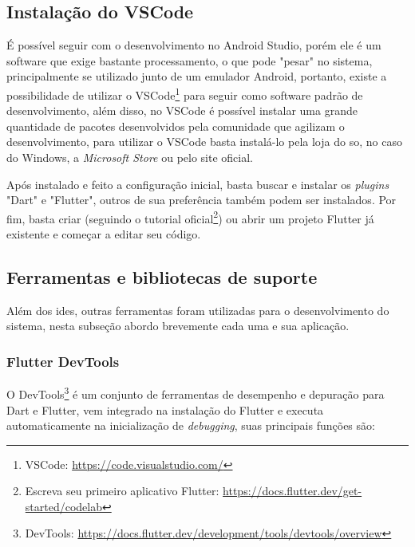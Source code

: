 \subsection{Instalação do VSCode}\label{ssec:instalacao_vscode}
É possível seguir com o desenvolvimento no Android Studio, porém ele é um software que exige bastante processamento, o que pode "pesar" no sistema, principalmente se utilizado junto de um emulador Android, portanto, existe a possibilidade de utilizar o VSCode\footnote{\label{vscode}VSCode: \url{https://code.visualstudio.com/}} para seguir como software padrão de desenvolvimento, além disso, no VSCode é possível instalar uma grande quantidade de pacotes desenvolvidos pela comunidade que agilizam o desenvolvimento, para utilizar o VSCode basta instalá-lo pela loja do \ac{so}, no caso do Windows, a \textit{Microsoft Store} ou pelo site oficial. 

Após instalado e feito a configuração inicial, basta buscar e instalar os \textit{plugins} "Dart" e "Flutter", outros de sua preferência também podem ser instalados. Por fim, basta criar (seguindo o tutorial oficial\footnote{\label{create_app}Escreva seu primeiro aplicativo Flutter: \url{https://docs.flutter.dev/get-started/codelab}}) ou abrir um projeto Flutter já existente e começar a editar seu código.

\subsection{Ferramentas e bibliotecas de suporte}\label{ssec:ferramentas}
Além dos \acp{ide}, outras ferramentas foram utilizadas para o desenvolvimento do sistema, nesta subseção abordo brevemente cada uma e sua aplicação.
\subsubsection{Flutter DevTools}\label{sssec:flutter_devtools}
O DevTools\footnote{\label{dev_tools}DevTools: \url{https://docs.flutter.dev/development/tools/devtools/overview}} é um conjunto de ferramentas de desempenho e depuração para Dart e Flutter, vem integrado na instalação do Flutter e executa automaticamente na inicialização de \textit{debugging}, suas principais funções são:

